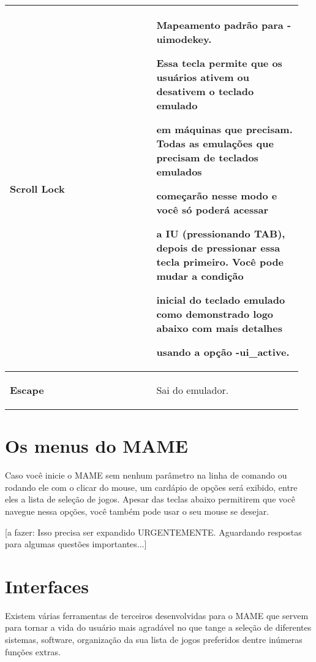 \documentclass[letterpaper,10pt,brazil]{sphinxmanual}
\begin{document}
\begin{longtable}{|p{0.475\linewidth}|p{0.475\linewidth}|}
\hline
\textbf{Scroll Lock}
&
\begin{DUlineblock}{0em}
\item[] Mapeamento padrão para \textbf{-uimodekey}.
\item[] 
\item[] Essa tecla permite que os usuários ativem ou desativem o teclado emulado
\item[] em máquinas que precisam. Todas as emulações que precisam de teclados emulados
\item[] começarão nesse modo e você só poderá acessar
\item[] a IU (pressionando TAB), depois de pressionar essa tecla primeiro. Você pode mudar a condição
\item[] inicial do teclado emulado como demonstrado logo abaixo com mais detalhes
\item[] usando a opção \textbf{-ui\_active}.
\end{DUlineblock}
\\
\hline
\textbf{Escape}
&
\begin{DUlineblock}{0em}
\item[] Sai do emulador.
\end{DUlineblock}
\\
\hline\end{longtable}


\section{Os menus do MAME}
\label{usingmame/mamemenus:os-menus-do-mame}\label{usingmame/mamemenus::doc}
Caso você inicie o MAME sem nenhum parâmetro na linha de comando ou
rodando ele com o clicar do mouse, um cardápio de opções será exibido,
entre eles a lista de seleção de jogos. Apesar das teclas abaixo
permitirem que você navegue nessa opções, você também pode usar o seu
mouse se desejar.

{[}a fazer: Isso precisa ser expandido URGENTEMENTE. Aguardando respostas
para algumas questões importantes...{]}


\section{Interfaces}
\label{usingmame/frontends:interfaces}\label{usingmame/frontends::doc}\label{usingmame/frontends:frontends}
Existem várias ferramentas de terceiros desenvolvidas para o MAME que
servem para tornar a vida do usuário mais agradável no que tange a
seleção de diferentes sistemas, software, organização da sua lista de
jogos preferidos dentre inúmeras funções extras.
\end{document}
